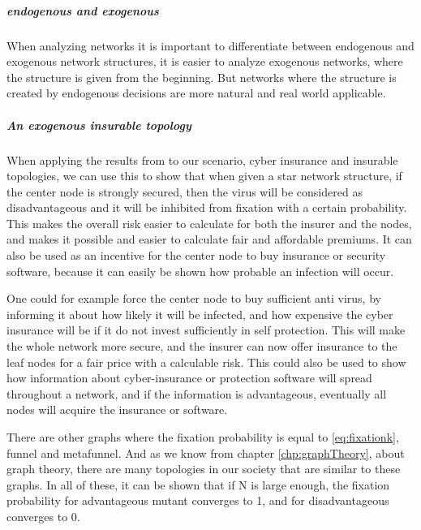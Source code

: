 \subparagraph{endogenous and exogenous}
When analyzing networks it is important to differentiate between endogenous and exogenous network structures, it is easier to analyze exogenous networks, where the structure is given from the beginning. But networks where the structure is created by endogenous decisions are more natural and real world applicable. 

\subparagraph{An exogenous insurable topology}
When applying the results from \cite{lieberman2005evolutionary} to our scenario, cyber insurance and insurable topologies, we can use this to show
 that when given a star network structure, if the center node is strongly secured, then the virus will be considered as disadvantageous and
it will be inhibited from fixation with a certain probability. 
This makes the overall risk easier to calculate for both the insurer and the nodes,
and makes it possible and easier to calculate fair and affordable premiums. 
It can also be used as an incentive for the center node to buy insurance or security software, 
because it can easily be shown how probable an infection will occur. 

One could for example force the center node to buy sufficient anti virus, 
by informing it about how likely it will be infected, and how expensive the cyber insurance will be if 
it do not invest sufficiently in self protection. This will make the whole network more secure, 
and the insurer can now offer insurance to the leaf nodes for a fair price with a calculable risk. 
This could also be used to show how information about cyber-insurance or protection software will
spread throughout a network, and if the information is advantageous, eventually all nodes will acquire
the insurance or software.
    
There are other graphs where the fixation probability is equal to \ref{eq:fixationk}, funnel and
metafunnel. And as we know from chapter \ref{chp:graphTheory}, about graph theory, there are many
topologies in our society that are similar to these graphs.  In all of these, it can be
shown that if N is large enough, the fixation probability for advantageous mutant converges to 1, 
and for disadvantageous converges to 0.

